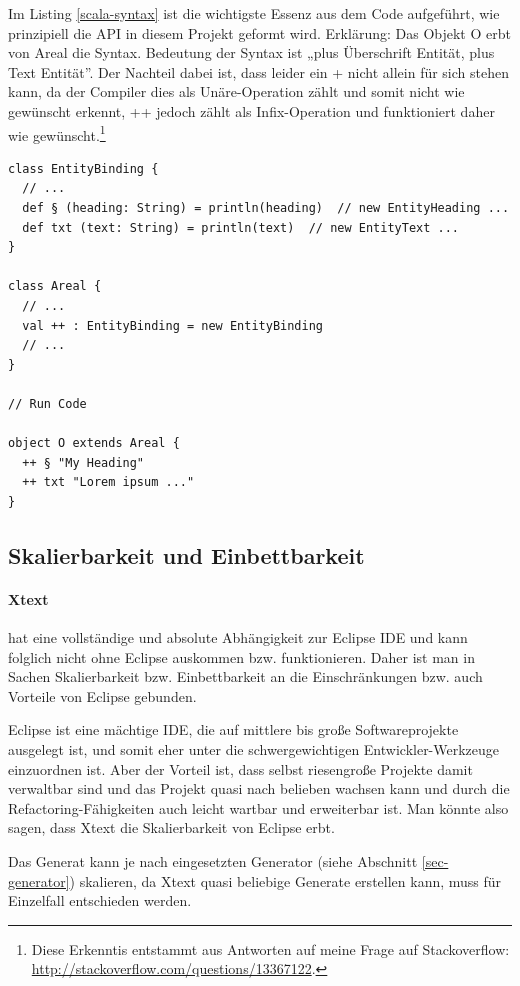 Im Listing \ref{scala-syntax} ist die wichtigste Essenz aus dem Code
aufgeführt, wie prinzipiell die API in diesem Projekt geformt wird.
Erklärung: Das Objekt O erbt von Areal die Syntax. Bedeutung der Syntax ist
„plus Überschrift Entität, plus Text Entität”. Der Nachteil dabei ist,
dass leider ein + nicht allein für sich stehen kann, da der Compiler dies
als Unäre-Operation zählt und somit nicht wie gewünscht erkennt, ++ jedoch
zählt als Infix-Operation und funktioniert daher wie gewünscht.\footnote{
Diese Erkenntis entstammt aus Antworten auf meine Frage auf Stackoverflow:
\url{http://stackoverflow.com/questions/13367122}.}

\begin{lstlisting}[label=scala-syntax,caption=Scala DSL Syntax (Snippet).]
class EntityBinding {
  // ...
  def § (heading: String) = println(heading)  // new EntityHeading ...
  def txt (text: String) = println(text)  // new EntityText ...
}

class Areal {
  // ...
  val ++ : EntityBinding = new EntityBinding
  // ...
}

// Run Code

object O extends Areal {
  ++ § "My Heading"
  ++ txt "Lorem ipsum ..."
}
\end{lstlisting}

\subsection{Skalierbarkeit und Einbettbarkeit}\label{sec-scalierEinbett}

\paragraph{Xtext} hat eine vollständige und absolute Abhängigkeit
zur Eclipse IDE und kann folglich nicht ohne Eclipse auskommen bzw.
funktionieren. Daher ist man in Sachen Skalierbarkeit bzw. Einbettbarkeit
an die Einschränkungen bzw. auch Vorteile von Eclipse gebunden.

Eclipse ist eine mächtige IDE, die auf mittlere bis große Softwareprojekte
ausgelegt ist, und somit eher unter die schwergewichtigen Entwickler-Werkzeuge
einzuordnen ist. Aber der Vorteil ist, dass selbst riesengroße Projekte
damit verwaltbar sind und das Projekt quasi nach belieben wachsen kann und
durch die Refactoring-Fähigkeiten auch leicht wartbar und erweiterbar ist.
Man könnte also sagen, dass Xtext die Skalierbarkeit von Eclipse erbt.

Das Generat kann je nach eingesetzten Generator (siehe Abschnitt
\ref{sec-generator}) skalieren, da Xtext quasi beliebige Generate erstellen
kann, muss für Einzelfall entschieden werden.


